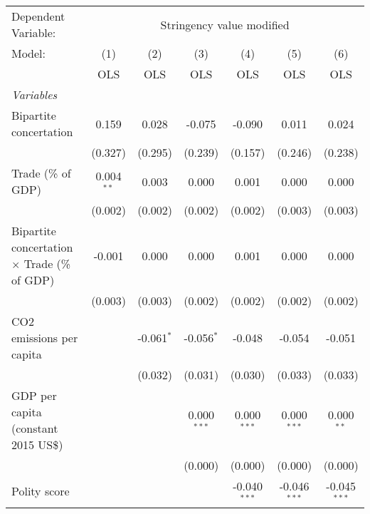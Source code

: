 
\begingroup
\centering
\begin{tabular}{lcccccc}
   \toprule
   Dependent Variable: & \multicolumn{6}{c}{Stringency value modified}\\
   Model:                                              & (1)          & (2)          & (3)           & (4)            & (5)            & (6)\\  
                                                       &  OLS         & OLS          & OLS           & OLS            & OLS            & OLS\\  
   \midrule
   \emph{Variables}\\
   Bipartite concertation                              & 0.159        & 0.028        & -0.075        & -0.090         & 0.011          & 0.024\\   
                                                       & (0.327)      & (0.295)      & (0.239)       & (0.157)        & (0.246)        & (0.238)\\   
   Trade (\% of GDP)                                   & 0.004$^{**}$ & 0.003        & 0.000         & 0.001          & 0.000          & 0.000\\   
                                                       & (0.002)      & (0.002)      & (0.002)       & (0.002)        & (0.003)        & (0.003)\\   
   Bipartite concertation $\times$ Trade (\% of GDP)   & -0.001       & 0.000        & 0.000         & 0.001          & 0.000          & 0.000\\   
                                                       & (0.003)      & (0.003)      & (0.002)       & (0.002)        & (0.002)        & (0.002)\\   
   CO2 emissions per capita                            &              & -0.061$^{*}$ & -0.056$^{*}$  & -0.048         & -0.054         & -0.051\\   
                                                       &              & (0.032)      & (0.031)       & (0.030)        & (0.033)        & (0.033)\\   
   GDP per capita (constant 2015 US\$)                 &              &              & 0.000$^{***}$ & 0.000$^{***}$  & 0.000$^{***}$  & 0.000$^{**}$\\   
                                                       &              &              & (0.000)       & (0.000)        & (0.000)        & (0.000)\\   
   Polity score                                        &              &              &               & -0.040$^{***}$ & -0.046$^{***}$ & -0.045$^{***}$\\   

\end{tabular}
